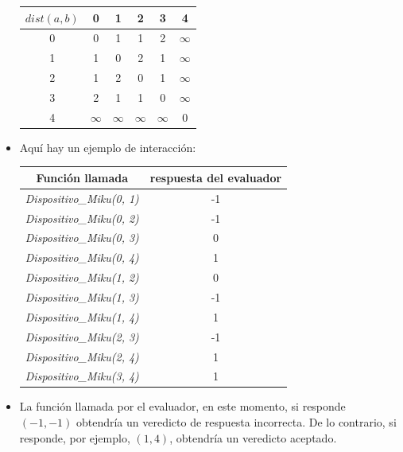 \documentclass[12pt]{scrartcl}
\begin{document}
\begin{itemize}
            \begin{center}
                \begin{tabular}{|c||c|c|c|c|c|}
                    \hline
                    $dist(a, b)$ & 0 & 1 & 2 & 3 & 4 \\
                    \hline
                    \hline
                     0 & 0 & 1 & 1 & 2 & $\infty$ \\
                     \hline
                     1 & 1 & 0 & 2 & 1 & $\infty$ \\
                     \hline
                     2 & 1 & 2 & 0 & 1 & $\infty$ \\
                     \hline
                     3 & 2 & 1 & 1 & 0 & $\infty$ \\
                     \hline
                     4 & $\infty$ & $\infty$ & $\infty$ & $\infty$ & 0 \\
                     \hline 
                \end{tabular}
            \end{center}
            \item Aquí hay un ejemplo de interacción:
            \begin{center}
                \begin{tabular}{|c|c|}
                    \hline
                     Función llamada & respuesta del evaluador \\
                     \hline 
                     \hline 
                     \textit{Dispositivo\_Miku(0, 1)} & -1 \\
                     \hline 
                     \textit{Dispositivo\_Miku(0, 2)} & -1 \\
                     \hline 
                     \textit{Dispositivo\_Miku(0, 3)} & 0 \\
                     \hline 
                     \textit{Dispositivo\_Miku(0, 4)} & 1 \\
                     \hline 
                     \textit{Dispositivo\_Miku(1, 2)} & 0 \\
                     \hline 
                     \textit{Dispositivo\_Miku(1, 3)} & -1 \\
                     \hline 
                     \textit{Dispositivo\_Miku(1, 4)} & 1 \\
                     \hline 
                     \textit{Dispositivo\_Miku(2, 3)} & -1 \\
                     \hline 
                     \textit{Dispositivo\_Miku(2, 4)} & 1 \\
                     \hline 
                     \textit{Dispositivo\_Miku(3, 4)} & 1 \\
                     \hline 
                \end{tabular}
            \end{center}
            \item La función llamada por el evaluador, en este momento, si responde $(-1, -1)$ obtendría un veredicto de respuesta incorrecta. De lo contrario, si responde, por ejemplo, $(1, 4)$, obtendría un veredicto aceptado.
        \end{itemize}
        
\end{document}
